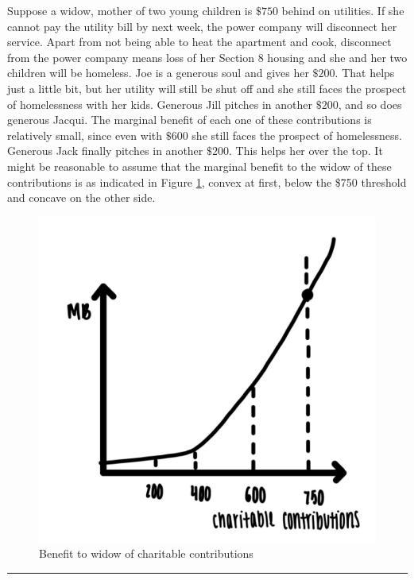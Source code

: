 \documentclass[
]{book}
\begin{document}
Suppose a widow, mother of two young children is \(\$750\) behind on utilities. If she cannot pay the utility bill by next week, the power company will disconnect her service. Apart from not being able to heat the apartment and cook, disconnect from the power company means loss of her Section 8 housing and she and her two children will be homeless. Joe is a generous soul and gives her \(\$200\). That helps just a little bit, but her utility will still be shut off and she still faces the prospect of homelessness with her kids. Generous Jill pitches in another \(\$200\), and so does generous Jacqui. The marginal benefit of each one of these contributions is relatively small, since even with \(\$600\) she still faces the prospect of homelessness. Generous Jack finally pitches in another \(\$200\). This helps her over the top. It might be reasonable to assume that the marginal benefit to the widow of these contributions is as indicated in Figure \ref{fig:rationalchoice10}, convex at first, below the \$750 threshold and concave on the other side.

\begin{figure}

{\centering \includegraphics[width=0.75\linewidth]{img/rationalchoice/fig10} 

}

\caption{Benefit to widow of charitable contributions}\label{fig:rationalchoice10}
\end{figure}

\begin{center}\rule{0.5\linewidth}{0.5pt}\end{center}
\end{document}
